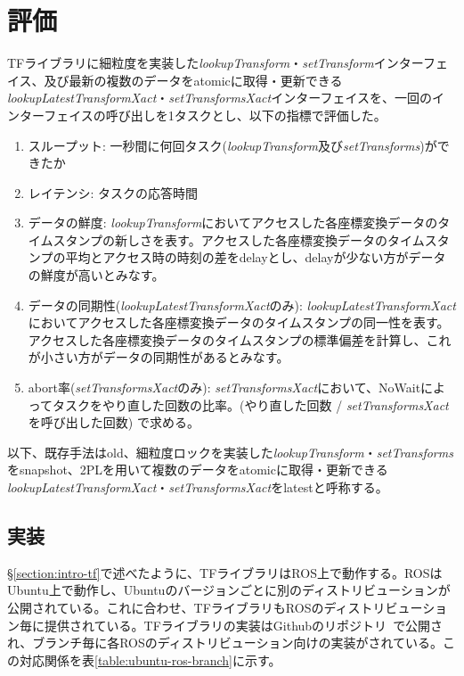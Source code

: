 \documentclass[a4paper]{jreport}	%
\begin{document}
\chapter{評価}
TFライブラリに細粒度を実装した\textit{lookupTransform}・\textit{setTransform}インターフェイス、及び最新の複数のデータをatomicに取得・更新できる\textit{lookupLatestTransformXact}・\textit{setTransformsXact}インターフェイスを、一回のインターフェイスの呼び出しを1タスクとし、以下の指標で評価した。

\begin{enumerate}
	\item スループット: 一秒間に何回タスク(\textit{lookupTransform}及び\textit{setTransforms})ができたか
	\item レイテンシ: タスクの応答時間
	\item データの鮮度: \textit{lookupTransform}においてアクセスした各座標変換データのタイムスタンプの新しさを表す。アクセスした各座標変換データのタイムスタンプの平均とアクセス時の時刻の差をdelayとし、delayが少ない方がデータの鮮度が高いとみなす。
	\item データの同期性(\textit{lookupLatestTransformXact}のみ): \textit{lookupLatestTransformXact}においてアクセスした各座標変換データのタイムスタンプの同一性を表す。アクセスした各座標変換データのタイムスタンプの標準偏差を計算し、これが小さい方がデータの同期性があるとみなす。
	\item abort率(\textit{setTransformsXact}のみ): \textit{setTransformsXact}において、NoWaitによってタスクをやり直した回数の比率。(やり直した回数 / \textit{setTransformsXact}を呼び出した回数) で求める。
\end{enumerate}

以下、既存手法はold、細粒度ロックを実装した\textit{lookupTransform}・\textit{setTransforms}をsnapshot、2PLを用いて複数のデータをatomicに取得・更新できる\textit{lookupLatestTransformXact}・\textit{setTransformsXact}をlatestと呼称する。

\section{実装}
§\ref{section:intro-tf}で述べたように、TFライブラリはROS上で動作する。ROSはUbuntu上で動作し、Ubuntuのバージョンごとに別のディストリビューションが公開されている。これに合わせ、TFライブラリもROSのディストリビューション毎に提供されている。TFライブラリの実装はGithubのリポジトリ~\cite{ros-geometry2}で公開され、ブランチ毎に各ROSのディストリビューション向けの実装がされている。この対応関係を表\ref{table:ubuntu-ros-branch}に示す。
\end{document}
